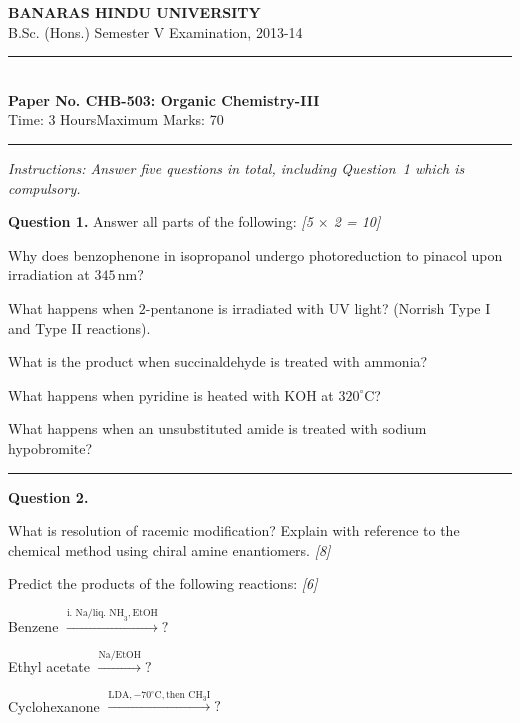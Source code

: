 \documentclass[11pt,a4paper]{article}
\newcommand{\pts}[1]{\hfill   \textit{[#1]}}
\begin{document}
\begin{center}
  {\large\bfseries BANARAS HINDU UNIVERSITY}\\[2pt]
  {\normalsize B.Sc. (Hons.) Semester V Examination, 2013-14}\\[6pt]
  \rule{0.8\linewidth}{0.5pt}\\[6pt]
  {\large\bfseries Paper No. CHB-503: Organic Chemistry-III}\\[4pt]
  {\normalsize Time: 3 Hours\hfill Maximum Marks: 70}
\end{center}
\rule{\linewidth}{0.4pt}
\small



\noindent   \textit{Instructions: Answer five questions in total, including Question~1 which is compulsory.}

\normalsize
\bigskip




\noindent   \textbf{Question 1.} Answer all parts of the following: \pts{5 $ \times$ 2 = 10}

\begin{parts}
  \item Why does benzophenone in isopropanol undergo photoreduction to pinacol upon irradiation at $345\, \text{nm}$?
  \item What happens when $2$-pentanone is irradiated with UV light? (Norrish Type I and Type II reactions).
  \item What is the product when succinaldehyde is treated with ammonia?
  \item What happens when pyridine is heated with $ \text{KOH}$ at $320^\circ \text{C}$?
  \item What happens when an unsubstituted amide is treated with sodium hypobromite?
\end{parts}

\medskip\rule{\linewidth}{0.2pt}




\noindent   \textbf{Question 2.}

\begin{parts}
  \item What is resolution of racemic modification? Explain with reference to the chemical method using chiral amine enantiomers. \pts{8}
  \item Predict the products of the following reactions: \pts{6}
  
\begin{parts}
    \item Benzene $\xrightarrow{ \text{i. Na/liq. NH}_3,  \text{EtOH}} ?$
    \item Ethyl acetate $\xrightarrow{ \text{Na/EtOH}} ?$
    \item Cyclohexanone $\xrightarrow{ \text{LDA}, -70^\circ \text{C},  \text{then CH}_3 \text{I}} ?$
  \end{parts}
\end{parts}
\end{document}
